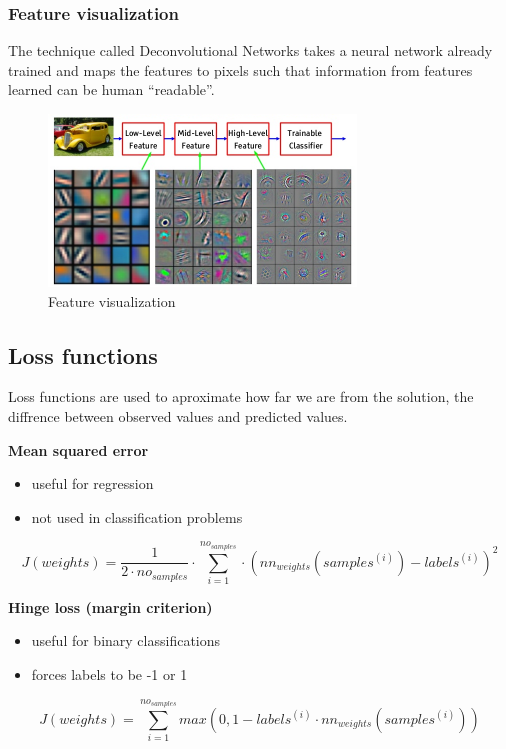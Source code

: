 \subsubsection{Feature visualization}
The technique called Deconvolutional Networks takes a neural network already trained and maps the features to pixels such that information from features learned can be human ``readable''.
~\\
\begin{figure}[h]
	\begin{center}
		\includegraphics[width=309px,height=173px]{src/img/state/features}
		\caption{Feature visualization\cite{fergus}} \label{fig:features}
    \end{center}
\end{figure}


\newpage
\subsection{Loss functions}
\label{loss}

Loss functions are used to aproximate how far we are from the solution, the diffrence between observed values and predicted values.

\textbf{Mean squared error}
\begin{itemize}
	\item{useful for regression}
	\item{not used in classification problems}
\end{itemize}
\begin{equation}
J(weights) = \frac{1}{2\cdot no_{samples}}\cdot\displaystyle\sum_{i=1}^{no_{samples}}\cdot(nn_{weights}(samples^{(i)}) - labels^{(i)})^2
\end{equation}

\textbf{Hinge loss (margin criterion)}
\begin{itemize}
	\item{useful for binary classifications}
	\item{forces labels to be -1 or 1}
\end{itemize}
\begin{equation}
J(weights) = \displaystyle\sum_{i=1}^{no_{samples}}max(0, 1 - labels^{(i)}\cdot nn_{weights}(samples^{(i)}))
\end{equation}


